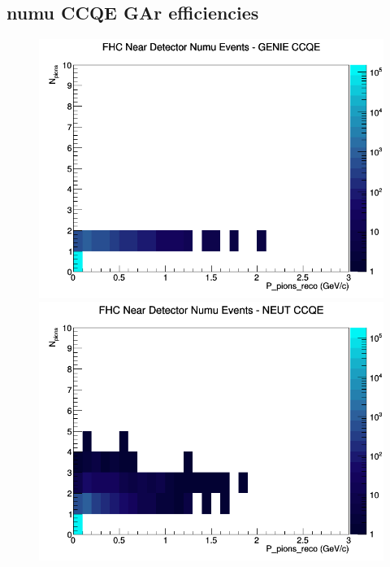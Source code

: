 \documentclass[12pt]{article}
\begin{document}
\subsection{numu CCQE GAr efficiencies}
\begin{figure}[h]
\includegraphics[width=\linewidth]{eff_N_P/GAr/pions/CCQE_FHC_ND_numu_N_P_GENIE.png}
\endminipage
{}
\includegraphics[width=\linewidth]{eff_N_P/GAr/pions/CCQE_FHC_ND_numu_N_P_NEUT.png}
\endminipage
{}

\end{figure}
\end{document}
